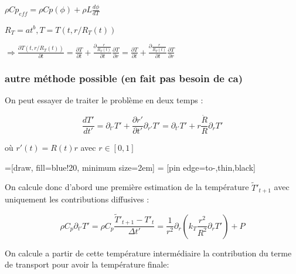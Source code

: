 \documentclass[10pt,a4paper]{article}
\numberwithin{equation}{section}
\begin{document}
$ \rho Cp_{eff} = \rho Cp(\phi) + \rho L  \frac{d \phi}{d T}$



$R_T = a t^b , T = T(t,r/R_T(t)) $

$\Rightarrow \frac{\partial T(t,r/R_T(t))}{\partial t}  = \frac{\partial T}{\partial t} + \frac{\partial \frac{r}{R_T(t)}}{\partial t}\frac{\partial T}{\partial r} = \frac{\partial T}{\partial t} + \frac{\partial \frac{r}{R_T(t)}}{\partial t}\frac{\partial T}{\partial r} $


\subsubsection{autre méthode possible (en fait pas besoin de ca)}


On peut essayer de traiter le problème en deux temps : 

\begin{equation}
\frac{ dT'}{dt'} = \partial_{t'} T' + \frac{\partial r'}{\partial t'} \partial_{r'} T' = \partial_{t'} T' + r \frac{\dot{R}}{R}\partial_{r} T'
\end{equation}

où $r'(t) = R(t)r$ avec $r \in [0,1]$

=[draw, fill=blue!20, minimum size=2em]
 = [pin edge={to-,thin,black}]


On calcule donc d'abord une première estimation de la température $\tilde{T}'_{t+1}$ avec uniquement les contributions diffusives :

\begin{equation}
\rho C_p \partial_{t'} T'= \rho C_p \frac{\tilde{T}'_{t+1} - T'_{t}}{\Delta t'} = \frac{1}{r^2} \partial_{r} ( k_{T} \frac{r^2}{R^2} \partial_{r} T')  + P
\end{equation}

On calcule a partir de cette température intermédiaire la contribution du terme de transport pour avoir la température finale:
\end{document}
